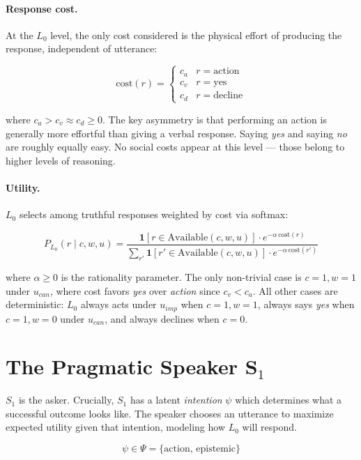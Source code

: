 \documentclass[12pt]{article}
\begin{document}
\paragraph{Response cost.}

At the $L_0$ level, the only cost considered is the physical effort of
producing the response, independent of utterance:

\[
\text{cost}(r) = \begin{cases}
c_a & r = \text{action} \\
c_v & r = \text{yes} \\
c_d & r = \text{decline}
\end{cases}
\]

where $c_a > c_v \approx c_d \geq 0$. 
The key asymmetry is that performing an action is generally more effortful than giving a verbal response. 
Saying \textit{yes} and saying \textit{no} are roughly equally easy. 
No social costs appear at this level --- those belong to higher levels of reasoning.

\paragraph{Utility.}

$L_0$ selects among truthful responses weighted by cost via softmax:

\[
P_{L_0}(r \mid c, w, u)
= \frac{\mathbf{1}[r \in \text{Available}(c,w,u)]
  \cdot e^{-\alpha\,\text{cost}(r)}}
  {\displaystyle\sum_{r'} \mathbf{1}[r' \in \text{Available}(c,w,u)]
  \cdot e^{-\alpha\,\text{cost}(r')}}
\]

where $\alpha \geq 0$ is the rationality parameter. The only
non-trivial case is $c=1, w=1$ under $u_{can}$, where cost favors
\textit{yes} over \textit{action} since $c_v < c_a$. All other cases
are deterministic: $L_0$ always acts under $u_{imp}$ when $c=1, w=1$,
always says \textit{yes} when $c=1, w=0$ under $u_{can}$, and always
declines when $c=0$.


\section{The Pragmatic Speaker S$_1$}

$S_1$ is the asker. Crucially, $S_1$ has a latent \textit{intention}
$\psi$ which determines what a successful outcome looks like. The
speaker chooses an utterance to maximize expected utility given that
intention, modeling how $L_0$ will respond.

\[
\psi \in \Psi = \{\text{action},\, \text{epistemic}\}
\]
\end{document}
